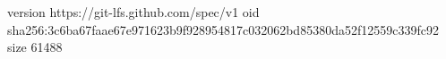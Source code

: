 version https://git-lfs.github.com/spec/v1
oid sha256:3c6ba67faae67e971623b9f928954817c032062bd85380da52f12559c339fc92
size 61488

